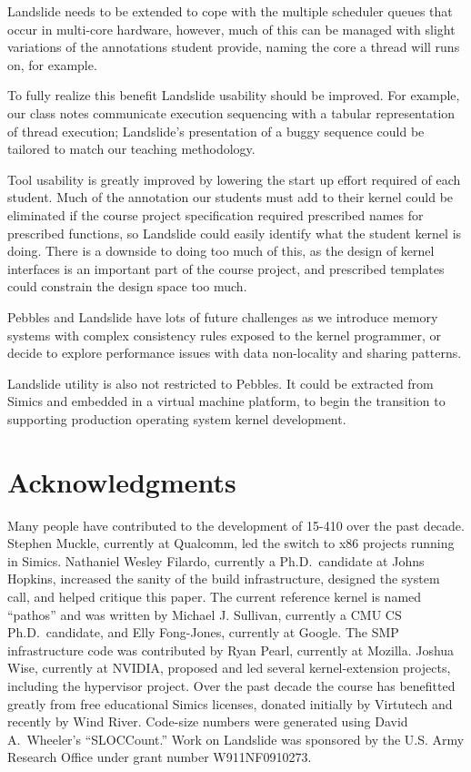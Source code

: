 Landslide needs to be extended to cope with the multiple scheduler queues that occur in multi-core hardware, however, much of this can be managed with slight variations of the annotations student provide, naming the core a thread will runs on, for example.

To fully realize this benefit Landslide usability should be improved.
For example, our class notes communicate execution sequencing with a tabular representation of thread execution; Landslide's presentation of a buggy sequence could be tailored to match our teaching methodology.

Tool usability is greatly improved by lowering the start up effort required of each student.
Much of the annotation our students must add to their kernel could be eliminated if the course project specification required prescribed names for prescribed functions, so Landslide could easily identify what the student kernel is doing.
There is a downside to doing too much of this, as the design of kernel interfaces is an important part of the course project, and prescribed templates could constrain the design space too much.

Pebbles and Landslide have lots of future challenges as we introduce memory systems with complex consistency rules exposed to the kernel programmer, or decide to explore performance issues with data non-locality and sharing patterns.

Landslide utility is also not restricted to Pebbles.
It could be extracted from Simics and embedded in a virtual machine platform, to begin the transition to supporting production operating system kernel development.


\section*{Acknowledgments}

Many people have contributed to the development of
15-410 over the past decade.
Stephen Muckle, currently at Qualcomm, led
the switch to x86 projects running in Simics.
Nathaniel Wesley Filardo,
currently a Ph.D.\ candidate at Johns Hopkins,
increased the sanity of the build infrastructure,
designed the  system call, and helped critique this paper.
The current reference kernel is named ``pathos''
and was written by Michael J. Sullivan,
currently a CMU CS Ph.D.\ candidate,
and Elly Fong-Jones, currently at Google.
The SMP infrastructure code was contributed by
Ryan Pearl, currently at Mozilla.
Joshua Wise, currently at NVIDIA,
proposed and led several kernel-extension projects,
including the hypervisor project.
Over the past decade the course has benefitted
greatly from free educational Simics licenses,
donated initially by Virtutech and recently by
Wind River.
Code-size numbers were generated using David A.\ Wheeler's
``SLOCCount.''
Work on Landslide was sponsored by the U.S. Army Research Office under grant number W911NF0910273.
